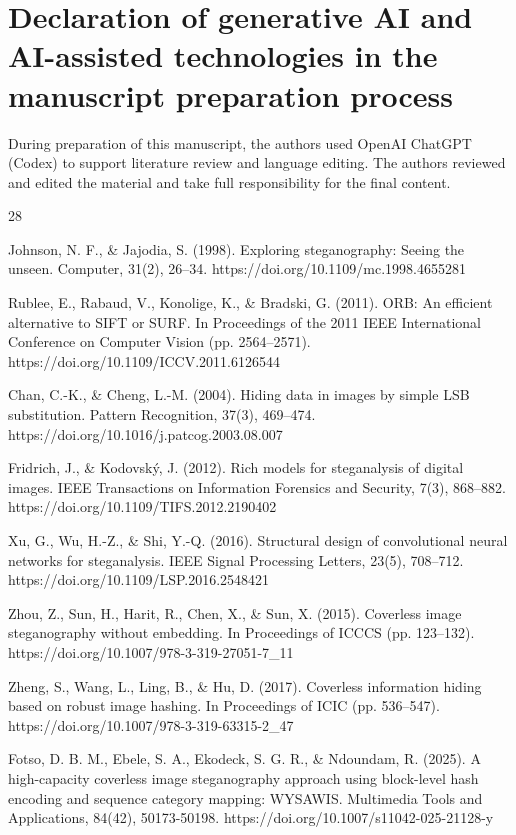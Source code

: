 \documentclass[preprint,12pt]{elsarticle}
\theoremstyle{plain}
\begin{document}
\section*{Declaration of generative AI and AI-assisted technologies in the manuscript preparation process}
During preparation of this manuscript, the authors used OpenAI ChatGPT (Codex) to support literature review and language editing. The authors reviewed and edited the material and take full responsibility for the final content.
\begin{thebibliography}{28}

Johnson, N. F., \& Jajodia, S. (1998). Exploring steganography: Seeing the unseen. Computer, 31(2), 26--34. https://doi.org/10.1109/mc.1998.4655281

Rublee, E., Rabaud, V., Konolige, K., \& Bradski, G. (2011). ORB: An efficient alternative to SIFT or SURF. In Proceedings of the 2011 IEEE International Conference on Computer Vision (pp. 2564--2571). https://doi.org/10.1109/ICCV.2011.6126544

Chan, C.-K., \& Cheng, L.-M. (2004). Hiding data in images by simple LSB substitution. Pattern Recognition, 37(3), 469--474. https://doi.org/10.1016/j.patcog.2003.08.007

Fridrich, J., \& Kodovský, J. (2012). Rich models for steganalysis of digital images. IEEE Transactions on Information Forensics and Security, 7(3), 868--882. https://doi.org/10.1109/TIFS.2012.2190402

Xu, G., Wu, H.-Z., \& Shi, Y.-Q. (2016). Structural design of convolutional neural networks for steganalysis. IEEE Signal Processing Letters, 23(5), 708--712. https://doi.org/10.1109/LSP.2016.2548421

Zhou, Z., Sun, H., Harit, R., Chen, X., \& Sun, X. (2015). Coverless image steganography without embedding. In Proceedings of ICCCS (pp. 123--132). https://doi.org/10.1007/978-3-319-27051-7\_11

Zheng, S., Wang, L., Ling, B., \& Hu, D. (2017). Coverless information hiding based on robust image hashing. In Proceedings of ICIC (pp. 536--547). https://doi.org/10.1007/978-3-319-63315-2\_47

Fotso, D. B. M., Ebele, S. A., Ekodeck, S. G. R., \& Ndoundam, R. (2025). A high-capacity coverless image steganography approach using block-level hash encoding and sequence category mapping: WYSAWIS. Multimedia Tools and Applications, 84(42), 50173-50198. https://doi.org/10.1007/s11042-025-21128-y


\end{thebibliography}
\end{document}

